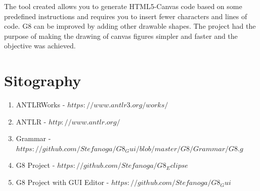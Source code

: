 \documentclass[a4paper]{article}
\begin{document}
The tool created allows you to generate HTML5-Canvas code based on some predefined instructions and requires you to insert fewer characters and lines of code.
G8 can be improved by adding other drawable shapes.
The project had the purpose of making the drawing of canvas figures simpler and faster and the objective was achieved.

\vspace{2\baselineskip}

\section{Sitography}

\begin{enumerate}
\item ANTLRWorks -  \href{https://www.antlr3.org/works/}{$https://www.antlr3.org/works/$} 
\item ANTLR - \href{http://www.antlr.org/}{$http://www.antlr.org/$}
\item Grammar - \href{https://github.com/Stefanoga/G8_Gui/blob/master/G8/Grammar/G8.g}{$https://github.com/Stefanoga/G8_Gui/blob/master/G8/Grammar/G8.g$}
\label{grammar}
\item G8 Project - \href{https://github.com/Stefanoga/G8_Eclipse}{$https://github.com/Stefanoga/G8_Eclipse$}
\item G8 Project with GUI Editor - \href{https://github.com/Stefanoga/G8_Gui}{$https://github.com/Stefanoga/G8_Gui$}
\end{enumerate}
\end{document}
